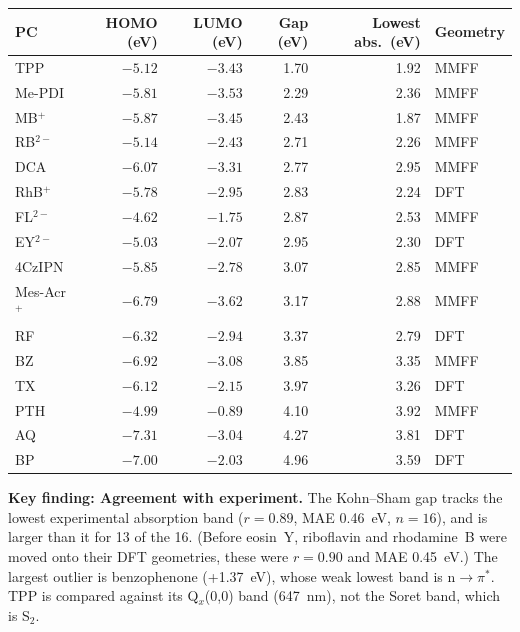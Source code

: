 \documentclass[11pt,a4paper]{article}
\newcommand{\notehead}[2]{\par\smallskip\noindent\textbf{#1: #2.}\enspace}
\begin{document}
\begin{center}\small
\begin{tabular}{@{}lrrrrl@{}}
\toprule
PC & HOMO (eV) & LUMO (eV) & Gap (eV) & Lowest abs.\ (eV) & Geometry \\
\midrule
TPP & $-5.12$ & $-3.43$ & 1.70 & 1.92 & MMFF \\
Me-PDI & $-5.81$ & $-3.53$ & 2.29 & 2.36 & MMFF \\
MB$^+$ & $-5.87$ & $-3.45$ & 2.43 & 1.87 & MMFF \\
RB$^{2-}$ & $-5.14$ & $-2.43$ & 2.71 & 2.26 & MMFF \\
DCA & $-6.07$ & $-3.31$ & 2.77 & 2.95 & MMFF \\
RhB$^+$ & $-5.78$ & $-2.95$ & 2.83 & 2.24 & DFT \\
FL$^{2-}$ & $-4.62$ & $-1.75$ & 2.87 & 2.53 & MMFF \\
EY$^{2-}$ & $-5.03$ & $-2.07$ & 2.95 & 2.30 & DFT \\
4CzIPN & $-5.85$ & $-2.78$ & 3.07 & 2.85 & MMFF \\
Mes-Acr$^+$ & $-6.79$ & $-3.62$ & 3.17 & 2.88 & MMFF \\
RF & $-6.32$ & $-2.94$ & 3.37 & 2.79 & DFT \\
BZ & $-6.92$ & $-3.08$ & 3.85 & 3.35 & MMFF \\
TX & $-6.12$ & $-2.15$ & 3.97 & 3.26 & DFT \\
PTH & $-4.99$ & $-0.89$ & 4.10 & 3.92 & MMFF \\
AQ & $-7.31$ & $-3.04$ & 4.27 & 3.81 & DFT \\
BP & $-7.00$ & $-2.03$ & 4.96 & 3.59 & DFT \\
\bottomrule
\end{tabular}

\end{center}

\notehead{Key finding}{Agreement with experiment}
The Kohn--Sham gap tracks the lowest experimental absorption band ($r=0.89$, MAE 0.46~eV,
$n=16$), and is larger than it for 13 of the 16. (Before eosin~Y, riboflavin and
rhodamine~B were moved onto their DFT geometries, these were $r=0.90$ and MAE 0.45~eV.) The largest outlier is benzophenone
(+1.37~eV), whose weak lowest band is n$\to\pi^*$. TPP is compared against its Q$_x$(0,0) band
(647~nm), not the Soret band, which is S$_2$.
\par\smallskip
\end{document}
